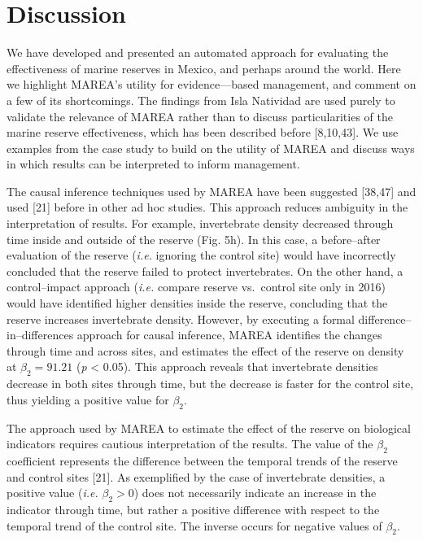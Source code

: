 \documentclass[12pt,]{article}
\begin{document}
\clearpage

\section{Discussion}\label{discussion}

We have developed and presented an automated approach for evaluating the
effectiveness of marine reserves in Mexico, and perhaps around the
world. Here we highlight MAREA's utility for evidence---based
management, and comment on a few of its shortcomings. The findings from
Isla Natividad are used purely to validate the relevance of MAREA rather
than to discuss particularities of the marine reserve effectiveness,
which has been described before {[}8,10,43{]}. We use examples from the
case study to build on the utility of MAREA and discuss ways in which
results can be interpreted to inform management.

The causal inference techniques used by MAREA have been suggested
{[}38,47{]} and used {[}21{]} before in other ad hoc studies. This
approach reduces ambiguity in the interpretation of results. For
example, invertebrate density decreased through time inside and outside
of the reserve (Fig. 5h). In this case, a before--after evaluation of
the reserve (\emph{i.e.} ignoring the control site) would have
incorrectly concluded that the reserve failed to protect invertebrates.
On the other hand, a control--impact approach (\emph{i.e.} compare
reserve vs.~control site only in 2016) would have identified higher
densities inside the reserve, concluding that the reserve increases
invertebrate density. However, by executing a formal
difference--in--differences approach for causal inference, MAREA
identifies the changes through time and across sites, and estimates the
effect of the reserve on density at \(\beta_2 = 91.21\) (\emph{p}
\textless{} 0.05). This approach reveals that invertebrate densities
decrease in both sites through time, but the decrease is faster for the
control site, thus yielding a positive value for \(\beta_2\).

The approach used by MAREA to estimate the effect of the reserve on
biological indicators requires cautious interpretation of the results.
The value of the \(\beta_2\) coefficient represents the difference
between the temporal trends of the reserve and control sites {[}21{]}.
As exemplified by the case of invertebrate densities, a positive value
(\emph{i.e.} \(\beta_2 > 0\)) does not necessarily indicate an increase
in the indicator through time, but rather a positive difference with
respect to the temporal trend of the control site. The inverse occurs
for negative values of \(\beta_2\).
\end{document}
